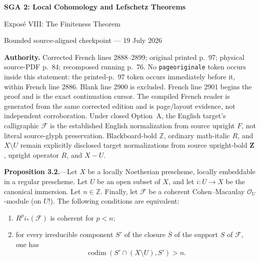 \documentclass[10pt,a4paper]{article}
\newcommand{\cF}{\mathcal F}
\newcommand{\cO}{\mathcal O}
\newcommand{\codimn}{\operatorname{codim}}
\begin{document}
\begin{center}
  {\Large\bfseries SGA 2: Local Cohomology and Lefschetz Theorems}\par\smallskip
  {\large Expos\'e VIII: The Finiteness Theorem}\par
  \small Bounded source-aligned checkpoint --- 19 July 2026
\end{center}
\noindent\colorbox{softgray}{\parbox{0.95\linewidth}{\footnotesize\textbf{Authority.}
Corrected French lines 2888--2899; original printed p.~97; physical
source-PDF p.~84; recomposed running p.~76. No \texttt{pageoriginale} token
occurs inside this statement: the printed-p.~97 token occurs immediately
before it, within French line 2886. Blank line 2900 is excluded. French
line 2901 begins the proof and is the exact continuation cursor. The compiled
French reader is generated from the same corrected edition and is page/layout
evidence, not independent corroboration. Under closed Option~A, the English
target's calligraphic $\cF$ is the established English normalization from
source upright $F$, not literal source-glyph preservation. Blackboard-bold
$\mathbb Z$, ordinary math-italic $R$, and $X\setminus U$ remain explicitly
disclosed target normalizations from source upright-bold $\mathbf Z$, upright
operator $R$, and $X-U$.}}

\medskip
\noindent\textbf{Proposition 3.2.}---Let $X$ be a locally Noetherian
prescheme, locally embeddable in a regular prescheme. Let $U$ be an open
subset of $X$, and let $i\colon U\to X$ be the canonical immersion. Let
$n\in\mathbb Z$. Finally, let $\cF$ be a coherent Cohen--Macaulay
$\cO_U$-module (on $U$!). The following conditions are equivalent:
\begin{enumerate}
\item[(a)] $R^p i_*(\cF)$ is coherent for $p<n$;
\item[(b)] for every irreducible component $S'$ of the closure $\overline S$
of the support $S$ of $\cF$, one has
\[
  \codimn(S'\cap(X\setminus U),S')>n.
\]
\end{enumerate}
\end{document}
